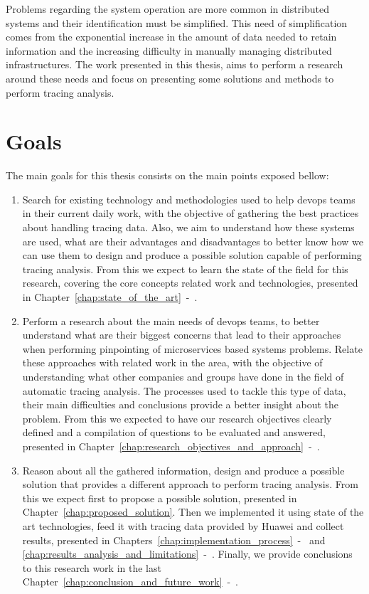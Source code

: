 Problems regarding the system operation are more common in distributed systems and their identification must be simplified. This need of simplification comes from the exponential increase in the amount of data needed to retain information and the increasing difficulty in manually managing distributed infrastructures. The work presented in this thesis, aims to perform a research around these needs and focus on presenting some solutions and methods to perform tracing analysis.

\section{Goals}
\label{sec:goals}

The main goals for this thesis consists on the main points exposed bellow:

\begin{enumerate}
    \item Search for existing technology and methodologies used to help \gls{devops} teams in their current daily work, with the objective of gathering the best practices about handling tracing data. Also, we aim to understand how these systems are used, what are their advantages and disadvantages to better know how we can use them to design and produce a possible solution capable of performing tracing analysis. From this we expect to learn the state of the field for this research, covering the core concepts related work and technologies, presented in Chapter~\ref{chap:state_of_the_art}~-~.
    \item Perform a research about the main needs of \gls{devops} teams, to better understand what are their biggest concerns that lead to their approaches when performing pinpointing of microservices based systems problems. Relate these approaches with related work in the area, with the objective of understanding what other companies and groups have done in the field of automatic tracing analysis. The processes used to tackle this type of data, their main difficulties and conclusions provide a better insight about the problem. From this we expected to have our research objectives clearly defined and a compilation of questions to be evaluated and answered, presented in Chapter~\ref{chap:research_objectives_and_approach}~-~.
    \item Reason about all the gathered information, design and produce a possible solution that provides a different approach to perform tracing analysis. From this we expect first to propose a possible solution, presented in Chapter~\ref{chap:proposed_solution}. Then we implemented it using state of the art technologies, feed it with tracing data provided by Huawei and collect results, presented in Chapters~\ref{chap:implementation_process}~-~ and \ref{chap:results_analysis_and_limitations}~-~. Finally, we provide conclusions to this research work in the last Chapter~\ref{chap:conclusion_and_future_work}~-~.
\end{enumerate}

